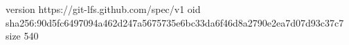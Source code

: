 version https://git-lfs.github.com/spec/v1
oid sha256:90d5fc6497094a462d247a5675735e6bc33da6f46d8a2790e2ea7d07d93c37c7
size 540
